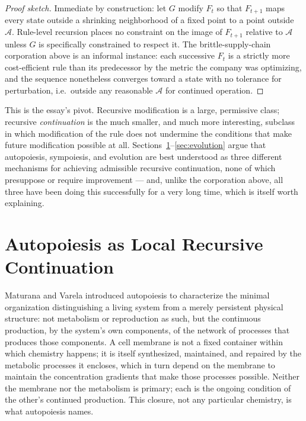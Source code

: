 \documentclass[12pt,a4paper]{article}
\theoremstyle{plain}
\theoremstyle{definition}
\theoremstyle{remark}
\newcommand{\Adm}{\mathcal{A}}
\begin{document}
\begin{proof}[Proof sketch]
Immediate by construction: let $G$ modify $F_t$ so that $F_{t+1}$ maps every state outside a shrinking neighborhood of a fixed point to a point outside $\Adm$. Rule-level recursion places no constraint on the image of $F_{t+1}$ relative to $\Adm$ unless $G$ is specifically constrained to respect it. The brittle-supply-chain corporation above is an informal instance: each successive $F_t$ is a strictly more cost-efficient rule than its predecessor by the metric the company was optimizing, and the sequence nonetheless converges toward a state with no tolerance for perturbation, i.e.\ outside any reasonable $\Adm$ for continued operation.
\end{proof}

This is the essay's pivot. Recursive modification is a large, permissive class; recursive \emph{continuation} is the much smaller, and much more interesting, subclass in which modification of the rule does not undermine the conditions that make future modification possible at all. Sections~\ref{sec:autopoiesis}--\ref{sec:evolution} argue that autopoiesis, sympoiesis, and evolution are best understood as three different mechanisms for achieving admissible recursive continuation, none of which presuppose or require improvement — and, unlike the corporation above, all three have been doing this successfully for a very long time, which is itself worth explaining.

\section{Autopoiesis as Local Recursive Continuation}
\label{sec:autopoiesis}

Maturana and Varela introduced autopoiesis to characterize the minimal organization distinguishing a living system from a merely persistent physical structure: not metabolism or reproduction as such, but the continuous production, by the system's own components, of the network of processes that produces those components. A cell membrane is not a fixed container within which chemistry happens; it is itself synthesized, maintained, and repaired by the metabolic processes it encloses, which in turn depend on the membrane to maintain the concentration gradients that make those processes possible. Neither the membrane nor the metabolism is primary; each is the ongoing condition of the other's continued production. This closure, not any particular chemistry, is what autopoiesis names.
\end{document}
